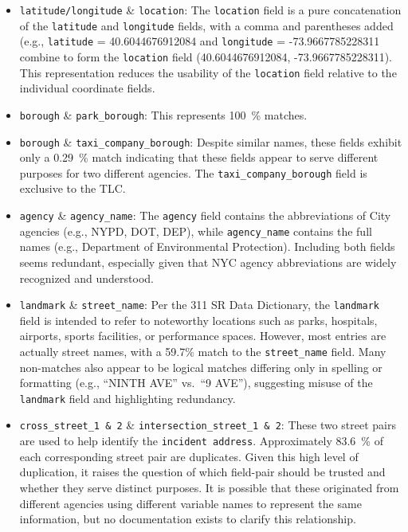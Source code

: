 \documentclass[linenumber]{jdsart}
\begin{document}
\begin{itemize}[left=1.5em, itemsep=0.25\baselineskip, align=parleft, label=\textbullet]

  \item \texttt{latitude/longitude} \& \texttt{location}:  
  The \texttt{location} field is a pure concatenation of 
  the \texttt{latitude} and \texttt{longitude} fields, with a 
  comma and parentheses added (e.g., \texttt{latitude} = 40.6044676912084 
  and \texttt{longitude} = -73.9667785228311 combine to form the \texttt{location} 
  field (40.6044676912084, -73.9667785228311). This representation reduces 
  the usability of the \texttt{location} field relative to the individual 
  coordinate fields.


  \item \texttt{borough} \& \texttt{park\_borough}:  This represents
   \SI{100}{\percent} matches.

  \item \texttt{borough} \& \texttt{taxi\_company\_borough}:  Despite 
  similar names, these fields exhibit only a \SI{0.29}{\percent} match 
  indicating that these fields appear to serve different purposes for two
  different agencies. The \texttt{taxi\_company\_borough} field is exclusive to the TLC.

  \item \texttt{agency} \& \texttt{agency\_name}:  
  The \texttt{agency} field contains the abbreviations of City 
  agencies (e.g., NYPD, DOT, DEP), while \texttt{agency\_name} 
  contains the full names (e.g., Department of Environmental Protection). 
  Including both fields seems redundant, especially given that NYC agency 
  abbreviations are widely recognized and understood.

  \item \texttt{landmark} \& \texttt{street\_name}:  
  Per the 311 SR Data Dictionary, the \texttt{landmark} field is intended 
  to refer to noteworthy locations such as parks, hospitals, airports, 
  sports facilities, or performance spaces. 
  However, most entries are actually street names, with a 59.7\% match 
  to the \texttt{street\_name} field. 
  Many non-matches also appear to be logical matches differing only 
  in spelling or formatting (e.g., ``NINTH AVE'' vs.\ ``9 AVE''), 
  suggesting misuse of the \texttt{landmark} field and highlighting redundancy.

  \item \texttt{cross\_street\_1 \& 2} \& \texttt{intersection\_street\_1 \& 2}:  
  These two street pairs are used to help identify the 
  \texttt{incident address}. Approximately \SI{83.6}{\percent} of each corresponding street pair
are duplicates. Given this high level of duplication, it raises the question of 
which field-pair should be trusted and whether they serve distinct 
purposes. It is possible that these originated from different agencies 
using different variable names to represent the same information, 
but no documentation exists to clarify this relationship.

\end{itemize}
\end{document}

